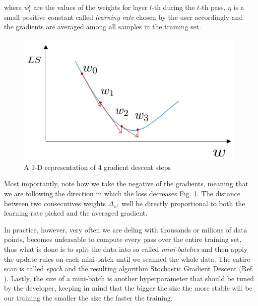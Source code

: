 \documentclass[LaM,binding=0.6cm]{./packages/sapthesis/sapthesis}
\begin{document}
            where $w_{l}^{t}$ are the values of the weights for layer $l$-th during the $t$-th pass, $\eta$ is a small positive constant called \textit{learning rate}
            chosen by the user accordingly and the gradients are averaged among all samples in the training set. 
            \begin{figure}[h!]
                \centering
                \includegraphics[scale=0.5]{gd}
                \caption{A 1-D representation of 4 gradient descent steps}
                \label{fig:gd}
            \end{figure}
            Most importantly, note how we take the negative of the gradients, meaning that we are following the direction in which the loss decreases Fig. \ref{fig:gd}. The distance
            between two consecutives weights $\Delta_{w^t}$ well be directly proportional to both the learning rate picked and the averaged gradient.

            In practice, however, very often we are deling with thousands or milions of data points, becomes unfeasable to compute every pass over
            the entire training set, thus what is done is to split the data into so called \textit{mini-batches} and then apply the
            update rules on each mini-batch until we scanned the whole data. The entire scan is called \textit{epoch} and the 
            resulting algorithm Stochastic Gradient Descent (Ref. ). Lastly, the size of a mini-batch is another hyperparameter 
            that should be tuned by the developer, keeping in mind that the bigger the size the more stable will be our training
            the smaller the size the faster the training.
\end{document}
